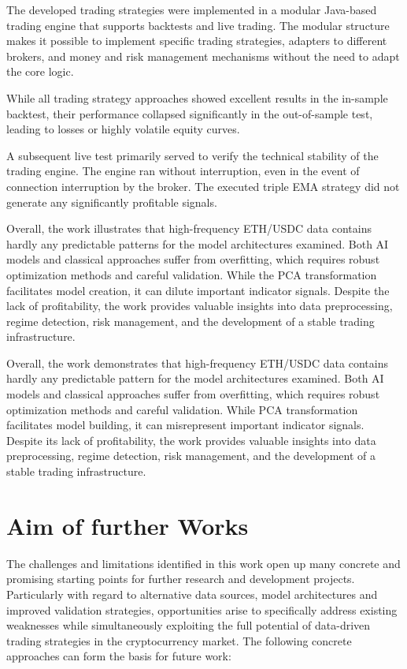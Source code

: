 The developed trading strategies were implemented in a modular Java-based trading engine that supports backtests and live trading.
The modular structure makes it possible to implement specific trading strategies, adapters to different brokers, and money and risk management mechanisms without the need to adapt the core logic.

While all trading strategy approaches showed excellent results in the in-sample backtest, their performance collapsed significantly in the out-of-sample test, leading to losses or highly volatile equity curves.

A subsequent live test primarily served to verify the technical stability of the trading engine.
The engine ran without interruption, even in the event of connection interruption by the broker.
The executed triple EMA strategy did not generate any significantly profitable signals.

Overall, the work illustrates that high-frequency ETH/USDC data contains hardly any predictable patterns for the model architectures examined.
Both AI models and classical approaches suffer from overfitting, which requires robust optimization methods and careful validation.
While the PCA transformation facilitates model creation, it can dilute important indicator signals.
Despite the lack of profitability, the work provides valuable insights into data preprocessing, regime detection, risk management, and the development of a stable trading infrastructure.

Overall, the work demonstrates that high-frequency ETH/USDC data contains hardly any predictable pattern for the model architectures examined.
Both AI models and classical approaches suffer from overfitting, which requires robust optimization methods and careful validation.
While PCA transformation facilitates model building, it can misrepresent important indicator signals.
Despite its lack of profitability, the work provides valuable insights into data preprocessing, regime detection, risk management, and the development of a stable trading infrastructure.

\section{Aim of further Works}

The challenges and limitations identified in this work open up many concrete and promising starting points for further research and development projects.
Particularly with regard to alternative data sources, model architectures and improved validation strategies, opportunities arise to specifically address existing weaknesses while simultaneously exploiting the full potential of data-driven trading strategies in the cryptocurrency market.
The following concrete approaches can form the basis for future work:

